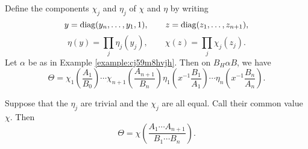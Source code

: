 \documentclass[reqno]{amsart} 
\begin{document}
\begin{lemma}
  Define the components $\chi_j$ and $\eta_j$ of $\chi$ and $\eta$ by writing
  \begin{equation}\label{eq:cj4y8xe8vt}
    y = \operatorname{diag}(y_n,\dotsc,y_1,1), \qquad z = \operatorname{diag}(z_1,\dotsc,z_{n+1}),
  \end{equation}
  \begin{equation*}
    \eta(y) = \prod _j \eta_j (y_j),
    \qquad
    \chi (z) = \prod_j \chi_j (z_j ).
  \end{equation*}
  Let $\alpha$ be as in Example \ref{example:cj59m8hvjh}.  Then on $B_H \alpha B$, we have
  \begin{equation*}
    \Theta
    =
    \chi_1 \left( \frac{A_1}{B_0} \right)
  \dotsb 
  \chi_{n+1} \left( \frac{A_{n+1}}{B_n} \right)
  \eta_1 \left( x^{-1} \frac{B_1}{A_1} \right)
  \dotsb 
  \eta_{n} \left( x^{-1} \frac{B_{n}}{A_n} \right).
  \end{equation*}
\end{lemma}
\begin{example}
  Suppose that the $\eta_j$ are trivial and the $\chi_j$ are all equal.  Call their common value $\chi$.  Then
  \begin{equation*}
    \Theta = \chi \left( \frac{A_1 \dotsb A_{n + 1}}{ B_1 \dotsb B_n } \right).
  \end{equation*}
\end{example}
\end{document}
